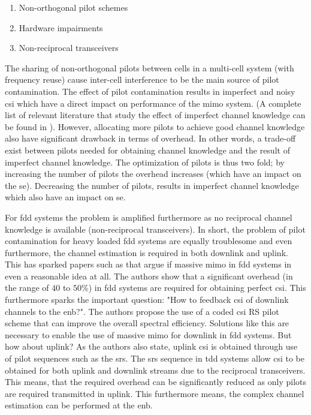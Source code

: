\begin{enumerate}
    \item Non-orthogonal pilot schemes
    \item Hardware impairments
    \item Non-reciprocal transceivers
\end{enumerate}

The sharing of non-orthogonal pilots between cells in a multi-cell system (with frequency reuse) cause inter-cell interference to be the main source of pilot contamination. The effect of pilot contamination results in imperfect and noisy \gls{csi} which have a direct impact on performance of the \gls{mimo} system. (A complete list of relevant literature that study the effect of imperfect channel knowledge can be found in \cite{Elijah2016ASystem}). However, allocating more pilots to achieve good channel knowledge also have significant drawback in terms of overhead. In other words, a trade-off exist between pilots needed for obtaining channel knowledge and the result of imperfect channel knowledge. The optimization of pilots is thus two fold; by increasing the number of pilots the overhead increases (which have an impact on the \gls{se}). Decreasing the number of pilots, results in imperfect channel knowledge which also have an impact on \gls{se}.

For \gls{fdd} systems the problem is amplified furthermore as no reciprocal channel knowledge is available (non-reciprocal transceivers). In short, the problem of pilot contamination for heavy loaded \gls{fdd} systems are equally troublesome and even furthermore, the channel estimation is required in both downlink and uplink. This has sparked papers such as \cite{ZirwasKeySystem} that argue if massive \gls{mimo} in \gls{fdd} systems in even a reasonable idea at all. The authors show that a significant overhead (in the range of  $40$ to $50\%$) in \gls{fdd} systems are required for obtaining perfect \gls{csi}. This furthermore sparks the important question: "How to feedback \gls{csi} of downlink channels to the \gls{enb}?". The authors propose the use of a coded \gls{csi} RS pilot scheme that can improve the overall spectral efficiency. Solutions like this are necessary to enable the use of massive \gls{mimo} for downlink in \gls{fdd} systems. But how about uplink? As the authors also state, uplink \gls{csi} is obtained through use of pilot sequences such as the \gls{srs}. The \gls{srs} sequence in \gls{tdd} systems allow \gls{csi} to be obtained for both uplink and downlink streams due to the reciprocal transceivers. This means, that the required overhead can be significantly reduced as only pilots are required transmitted in uplink. This furthermore means, the complex channel estimation can be performed at the \gls{enb}. 

